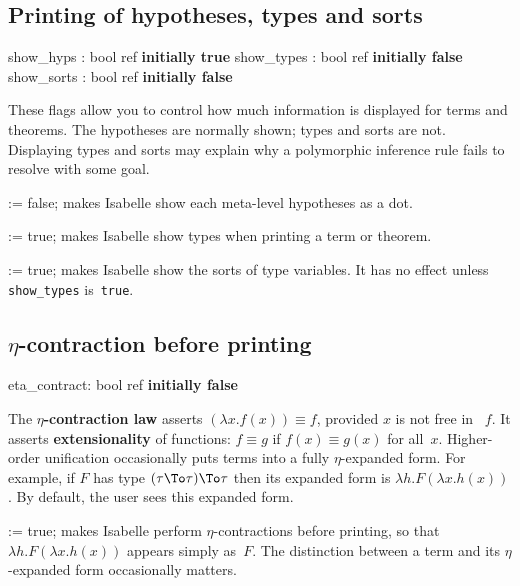 \subsection{Printing of hypotheses, types and sorts}
\begin{ttbox} 
show_hyps  : bool ref \hfill{\bf initially true}
show_types : bool ref \hfill{\bf initially false}
show_sorts : bool ref \hfill{\bf initially false}
\end{ttbox}
These flags allow you to control how much information is displayed for
terms and theorems.  The hypotheses are normally shown; types and sorts are
not.  Displaying types and sorts may explain why a polymorphic inference
rule fails to resolve with some goal.

\begin{ttdescription}
\item[\ttindexbold{show_hyps} := false;]   
makes Isabelle show each meta-level hypotheses as a dot.

\item[\ttindexbold{show_types} := true;]
makes Isabelle show types when printing a term or theorem.

\item[\ttindexbold{show_sorts} := true;]
makes Isabelle show the sorts of type variables.  It has no effect unless
{\tt show_types} is~{\tt true}. 
\end{ttdescription}


\subsection{$\eta$-contraction before printing}
\begin{ttbox} 
eta_contract: bool ref \hfill{\bf initially false}
\end{ttbox}
The {\bf $\eta$-contraction law} asserts $(\lambda x.f(x))\equiv f$,
provided $x$ is not free in ~$f$.  It asserts {\bf extensionality} of
functions: $f\equiv g$ if $f(x)\equiv g(x)$ for all~$x$.  Higher-order
unification occasionally puts terms into a fully $\eta$-expanded form.  For
example, if $F$ has type $(\tau\To\tau)\To\tau$ then its expanded form is
$\lambda h.F(\lambda x.h(x))$.  By default, the user sees this expanded
form.

\begin{ttdescription}
\item[\ttindexbold{eta_contract} := true;]
makes Isabelle perform $\eta$-contractions before printing, so that
$\lambda h.F(\lambda x.h(x))$ appears simply as~$F$.  The
distinction between a term and its $\eta$-expanded form occasionally
matters.
\end{ttdescription}


